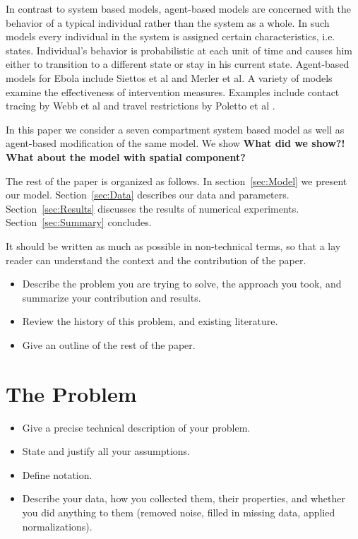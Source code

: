 \documentclass[10pt]{article}
\begin{document}
In contrast to system based models, agent-based models are concerned with the behavior of a typical individual rather than the system as a whole. In such models every individual in the system is assigned certain characteristics, i.e. states. Individual's behavior is probabilistic at each unit of time and causes him either to transition to a different state or stay in his current state. Agent-based models for Ebola include Siettos et al \cite{Siettos2015} and Merler et al\cite{Merler2015}. A variety of models examine the effectiveness of intervention measures. Examples include contact tracing by Webb et al \cite{Webb2015} and travel restrictions by Poletto et al \cite{Poletto2014}.

In this paper we consider a seven compartment system based model as well as agent-based modification of the same model. We show \textbf{What did we show?!} \textbf{What about the model with spatial component?}

The rest of the paper is organized as follows. In section~\ref{sec:Model} we present our model. Section~\ref{sec:Data} describes our data and parameters. Section~\ref{sec:Results} discusses the results of numerical experiments. Section~\ref{sec:Summary} concludes.

It should be written as much as possible in non-technical terms, so that a
lay reader can understand the context and the contribution of the paper.

\begin{itemize}
\item Describe the problem you are trying to solve, the approach
you took, and summarize your contribution and results.

\item Review the history of this problem, and existing literature.

\item Give an outline of the rest of the paper.
\end{itemize}


\section{The Problem}
\begin{itemize}
\item Give a precise technical description of your problem. 

\item State and justify all your assumptions. 

\item Define notation. 

\item Describe your data, how you collected them, their properties,
and whether you did 
anything to them (removed noise, filled in missing data, 
applied normalizations).
\end{itemize}
%
%
%
%
%
%
%
%
%
\end{document}
